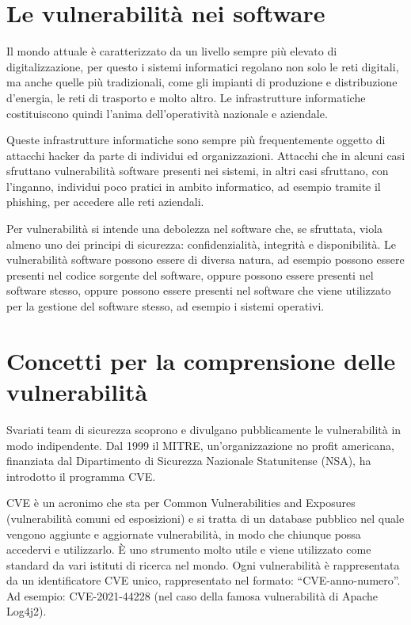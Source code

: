%
%
\section{Le vulnerabilità nei software}
Il mondo attuale è caratterizzato da un livello sempre più elevato di
digitalizzazione, per questo i sistemi informatici regolano non solo
le reti digitali, ma anche quelle più tradizionali, come gli impianti di
produzione e distribuzione d’energia, le reti di trasporto e molto altro. 
Le infrastrutture informatiche costituiscono quindi l’anima dell’operatività 
nazionale e aziendale.

Queste infrastrutture informatiche sono sempre più frequentemente oggetto 
di attacchi hacker da parte di individui ed organizzazioni. 
Attacchi che in alcuni casi sfruttano vulnerabilità software presenti nei 
sistemi, in altri casi sfruttano, con l’inganno, individui poco pratici in 
ambito informatico, ad esempio tramite il phishing, per accedere alle reti 
aziendali.

Per vulnerabilità si intende una debolezza nel software che, se sfruttata, 
viola almeno uno dei principi di sicurezza: confidenzialità, integrità e 
disponibilità. Le vulnerabilità software possono essere di diversa natura,
ad esempio possono essere presenti nel codice sorgente del software, oppure 
possono essere presenti nel software stesso, oppure possono essere presenti 
nel software che viene utilizzato per la gestione del software stesso, 
ad esempio i sistemi operativi.


\section{Concetti per la comprensione delle vulnerabilità}
Svariati team di sicurezza scoprono e divulgano pubblicamente le vulnerabilità
in modo indipendente. Dal 1999 il MITRE, un'organizzazione no profit 
americana, finanziata dal Dipartimento di Sicurezza Nazionale 
Statunitense (NSA), ha introdotto il programma CVE.

CVE è un acronimo che sta per Common Vulnerabilities and Exposures
(vulnerabilità comuni ed esposizioni) e si tratta di un database pubblico nel 
quale vengono aggiunte e aggiornate vulnerabilità, in modo che chiunque possa 
accedervi e utilizzarlo. 
È uno strumento molto utile e viene utilizzato come standard da vari istituti 
di ricerca nel mondo. Ogni vulnerabilità è rappresentata da un identificatore 
CVE unico, rappresentato nel formato: “CVE-anno-numero”. 
Ad esempio: CVE-2021-44228 (nel caso della famosa vulnerabilità 
di Apache Log4j2).

